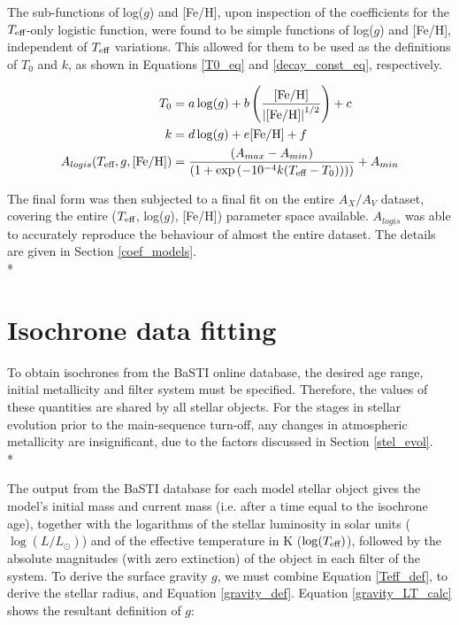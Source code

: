 \documentclass[12pt, a4paper]{report}
\begin{document}
The sub-functions of log($g$) and [Fe/H], upon inspection of the coefficients for the $T_{\textnormal{eff}}$-only logistic function, were found to be simple functions of log($g$) and [Fe/H], independent of $T_{\textnormal{eff}}$ variations. This allowed for them to be used as the definitions of $T_{0}$ and $k$, as shown in Equations \ref{T0_eq} and \ref{decay_const_eq}, respectively.

\begin{align}
T_{\textnormal{0}} &= a\log(g) + b\left(\frac{\textnormal{[Fe/H]}}{\left|\textnormal{[Fe/H]}\right|^{1/2}}\right) + c \label{T0_eq}\\
k &= d\log(g) + e\textnormal{[Fe/H]} + f \label{decay_const_eq}\\
A_{logis}(T_{\textnormal{eff}},g,\textnormal{[Fe/H]}) &= \frac{(A_{max}-A_{min})}{( 1 + \exp{(-10^{-4}k(T_{\textnormal{eff}}-T_{\textnormal{0}})) ) )}} + A_{min} \label{A_logis_UV}
\end{align}

The final form was then subjected to a final fit on the entire $A_{X}/A_{V}$ dataset, covering the entire ($T_{\textnormal{eff}}$,  log($g$), [Fe/H]) parameter space available. $A_{logis}$ was able to accurately reproduce the behaviour of almost the entire dataset. The details are given in Section \ref{coef_models}.\\*

\section{Isochrone data fitting}
To obtain isochrones from the BaSTI online database, the desired age range, initial metallicity and filter system must be specified. Therefore, the values of these quantities are shared by all stellar objects. For the stages in stellar evolution prior to the main-sequence turn-off, any changes in atmospheric metallicity are insignificant, due to the factors discussed in Section \ref{stel_evol}.\\*

The output from the BaSTI database for each model stellar object gives the model's initial mass and current mass (i.e. after a time equal to the isochrone age), together with the logarithms of the stellar luminosity in solar units ($\log(L/L_{\odot})$) and of the effective temperature in K ($\log(T_{\textnormal{eff}})$), followed by the absolute magnitudes (with zero extinction) of the object in each filter of the system. To derive the surface gravity $g$, we must combine Equation \ref{Teff_def}, to derive the stellar radius, and Equation \ref{gravity_def}. Equation \ref{gravity_LT_calc} shows the resultant definition of $g$:
\end{document}
